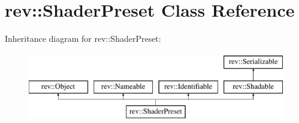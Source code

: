 \hypertarget{classrev_1_1_shader_preset}{}\section{rev\+::Shader\+Preset Class Reference}
\label{classrev_1_1_shader_preset}
Inheritance diagram for rev\+::Shader\+Preset\+:\begin{figure}[H]
\begin{center}
\leavevmode
\includegraphics[height=3.000000cm]{classrev_1_1_shader_preset}
\end{center}
\end{figure}
